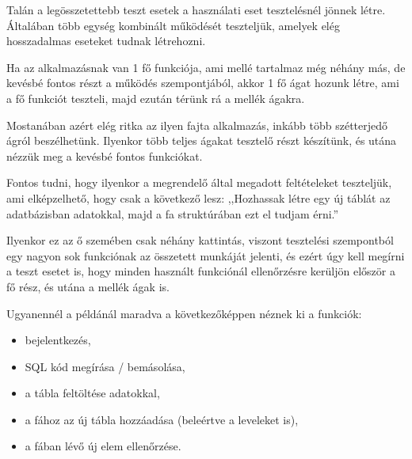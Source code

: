 
Talán a legösszetettebb teszt esetek a használati eset tesztelésnél jönnek létre. Általában több egység kombinált működését teszteljük, amelyek elég hosszadalmas eseteket tudnak létrehozni. 

Ha az alkalmazásnak van 1 fő funkciója, ami mellé tartalmaz még néhány más, de kevésbé fontos részt a működés szempontjából, akkor 1 fő ágat hozunk létre, ami a fő funkciót teszteli, majd ezután térünk rá a mellék ágakra.

Mostanában azért elég ritka az ilyen fajta alkalmazás, inkább több szétterjedő ágról beszélhetünk. Ilyenkor több teljes ágakat tesztelő részt készítünk, és utána nézzük meg a kevésbé fontos funkciókat.

Fontos tudni, hogy ilyenkor a megrendelő által megadott feltételeket teszteljük, ami elképzelhető, hogy csak a következő lesz: ,,Hozhassak létre egy új táblát az adatbázisban adatokkal, majd a fa struktúrában ezt el tudjam érni.''

Ilyenkor ez az ő szemében csak néhány kattintás, viszont tesztelési szempontból egy nagyon sok funkciónak az összetett munkáját jelenti, és ezért úgy kell megírni a teszt esetet is, hogy minden használt funkciónál ellenőrzésre kerüljön először a fő rész, és utána a mellék ágak is.

Ugyanennél a példánál maradva a következőképpen néznek ki a funkciók:
\begin{itemize}
	\item bejelentkezés,
	\item SQL kód megírása / bemásolása,
	\item a tábla feltöltése adatokkal,
	\item a fához az új tábla hozzáadása (beleértve a leveleket is),
	\item a fában lévő új elem ellenőrzése.
\end{itemize}

